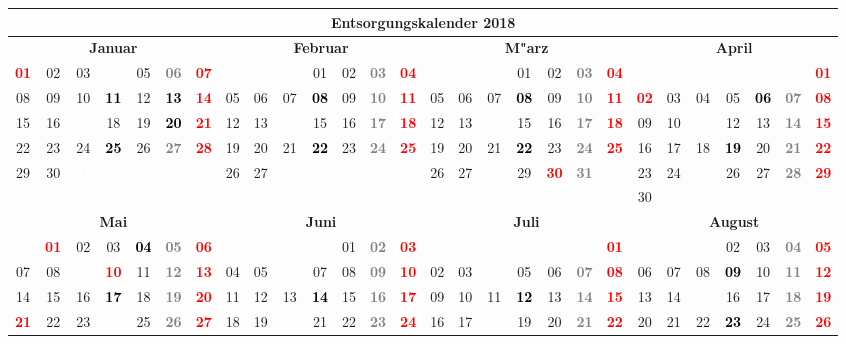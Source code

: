 \documentclass[10pt,a4paper,landscape]{article}
\newcommand{\gb}[1]{\cellcolor{SpringGreen}\textcolor{black}{\bf #1}}
\newcommand{\yb}[1]{\cellcolor{yellow}\textcolor{black}{\bf #1}}
\newcommand{\iv}[1]{\cellcolor{black}\textcolor{white}{\bf #1}}
\newcommand{\rb}[1]{\textbf{\textcolor{red}{#1}}}
\newcommand{\hv}[1]{\textbf{\textcolor{Gray}{#1}}}
\begin{document}
\begin{tabular}{|ccccccc|ccccccc|ccccccc|ccccccc|}
\hline
\multicolumn{28}{|c|}{\textbf{Entsorgungskalender 2018}} \\\hline
\multicolumn{7}{|c|}{\bf Januar} & \multicolumn{7}{|c|}{\bf Februar} & \multicolumn{7}{|c|}{\bf M"arz} & \multicolumn{7}{|c|}{\bf April} \\
\rb{01} & 02 & 03 & \iv{04} & 05 & \hv{06} & \rb{07} & & & & 01 & 02 & \hv{03} & \rb{04} & & & & 01 & 02 & \hv{03} & \rb{04} &  &  &  &  &  &  & \rb{01} \\
08 & 09 & 10 & \yb{11} & 12 & \gb{13} & \rb{14} & 05 & 06 & 07 & \yb{08} & 09 & \hv{10} & \rb{11} & 05 & 06 & 07 & \yb{08} & 09 & \hv{10} & \rb{11} & \rb{02} & 03 & 04 & 05 & \yb{06} & \hv{07} & \rb{08} \\
15 & 16 & \iv{17} & 18 & 19 & \gb{20} & \rb{21} & 12 & 13 & \iv{14} & 15 & 16 & \hv{17} & \rb{18} & 12 & 13 & \iv{14} & 15 & 16 & \hv{17} & \rb{18} & 09 & 10 & \iv{11} & 12 & 13 & \hv{14} & \rb{15} \\
22 & 23 & 24 & \yb{25} & 26 & \hv{27} & \rb{28} & 19 & 20 & 21 & \yb{22} & 23 & \hv{24} & \rb{25} & 19 & 20 & 21 & \yb{22} & 23 & \hv{24} & \rb{25} & 16 & 17 & 18 & \yb{19} & 20 & \hv{21} & \rb{22} \\
29 & 30 & \iv{31} & & & & & 26 & 27 & \iv{28} & & & & & 26 & 27 & \iv{28} & 29 & \rb{30} & \hv{31} & & 23 & 24 & \iv{25} & 26 & 27 & \hv{28} & \rb{29} \\
& & & & & & & & & & & & & & & & & & & & & 30 &  &  &  &  &  &  \\
\hline
\multicolumn{7}{|c|}{\bf Mai} & \multicolumn{7}{|c|}{\bf Juni} & \multicolumn{7}{|c|}{\bf Juli} & \multicolumn{7}{|c|}{\bf August} \\
& \rb{01} & 02 & 03 & \yb{04} & \hv{05} & \rb{06} & & & & & 01 & \hv{02} & \rb{03} & & & & & & & \rb{01} & & & \iv{01} & 02 & 03 & \hv{04} & \rb{05} \\
07 & 08 & \iv{09} & \rb{10} & 11 & \hv{12} & \rb{13} & 04 & 05 & \iv{06} & 07 & 08 & \hv{09} & \rb{10} & 02 & 03 & \iv{04} & 05 & 06 & \hv{07} & \rb{08} & 06 & 07 & 08 & \yb{09} & 10 & \hv{11} & \rb{12} \\
14 & 15 & 16 & \yb{17} & 18 & \hv{19} & \rb{20} & 11 & 12 & 13 & \yb{14} & 15 & \hv{16} & \rb{17} & 09 & 10 & 11 & \yb{12} & 13 & \hv{14} & \rb{15} & 13 & 14 & \iv{15} & 16 & 17 & \hv{18} & \rb{19} \\
\rb{21} & 22 & 23 & \iv{24} & 25 & \hv{26} & \rb{27} & 18 & 19 & \iv{20} & 21 & 22 & \hv{23} & \rb{24} & 16 & 17 & \iv{18} & 19 & 20 & \hv{21} & \rb{22} & 20 & 21 & 22 & \yb{23} & 24 & \hv{25} & \rb{26} \\

\end{tabular}
\end{document}
